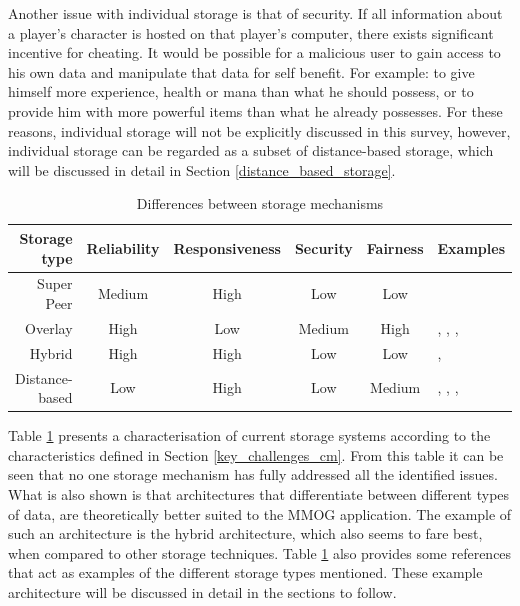\documentclass[10pt,a4paper,journal,cspaper,compsoc]{IEEEtran}
\begin{document}
Another issue with individual storage is that of security. If all information about a player's character is hosted on that player's computer, there
exists significant incentive for cheating. It would be possible for a malicious user to gain access to his own data and manipulate that data for self
benefit. For example: to give himself more experience, health or mana than what he should possess, or to provide him with more powerful items than
what he already possesses. For these reasons, individual storage will not be explicitly discussed in this survey, however, individual storage can be
regarded as a subset of distance-based storage, which will be discussed in detail in Section \ref{distance_based_storage}.

\begin{table}[htbp]
\centering
\begin{tabular}{|r|c|c|c|c|l|}
\hline
Storage type & Reliability & Responsiveness & Security & Fairness & Examples\\
\hline
Super Peer & Medium & High & Low & Low & \cite{knutsson_p2p_first}\\
Overlay & High & Low & Medium & High & \cite{Douglas05enablingmassively}, \cite{using_freenet_storage},
\cite{Fan_phd}, \cite{past_storage_focus}\\
Hybrid & High & High & Low & Low & \cite{zoned_federation}, \cite{hybrid_storage1}\\
Distance-based & Low & High & Low & Medium & \cite{Buyukkaya_voronoi_state_management}, \cite{Hu_voronoi_IM},
\cite{colyseus_distance_based}, \cite{solipsis}\\
\hline
\end{tabular}
\caption{Differences between storage mechanisms} \label{tab_storage}
\end{table}
%
Table \ref{tab_storage} presents a characterisation of current storage systems according to the characteristics defined in Section
\ref{key_challenges_cm}. From this table it can be seen that no one storage mechanism has fully addressed all the identified issues. What is also
shown is that architectures that differentiate between different types of data, are theoretically better suited to the MMOG application. The example
of such an architecture is the hybrid architecture, which also seems to fare best, when compared to other storage techniques. Table \ref{tab_storage}
also provides some references that act as examples of the different storage types mentioned. These example architecture will be discussed in detail
in the sections to follow.
\end{document}
